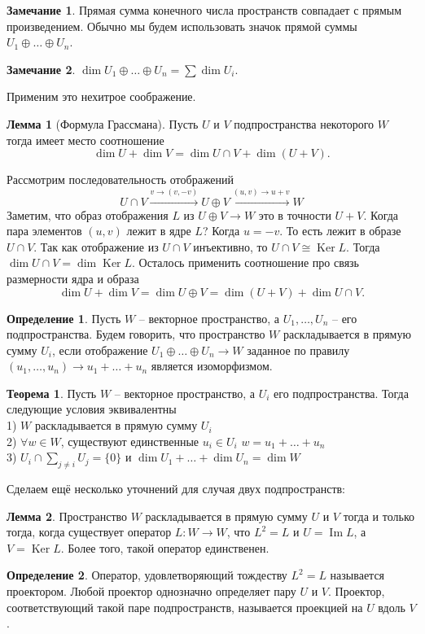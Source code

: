 \documentclass[10pt,a4paper,oneside]{book}
\theoremstyle{definition}
\newtheorem*{rem}{Замечание}
\newtheorem*{defn}{Определение}
\newtheorem{thm}{Теорема}
\newtheorem{lem}{Лемма}
\DeclareMathOperator{\Ker}{Ker}
\newcommand{\im}{\operatorname{Im}}
\def\thrm{\begin{thm}}
\def\ethrm{\end{thm}}
\def\dfn{\begin{defn}}
\def\edfn{\end{defn}}
\def\lm{\begin{lem}}
\def\elm{\end{lem}}
\def\rm{\begin{rem}}
\def\erm{\end{rem}}
\begin{document}
\rm Прямая сумма конечного числа пространств совпадает с прямым произведением. Обычно мы будем использовать значок прямой суммы $U_1\oplus \dots \oplus U_n$.
\erm


\rm $\dim U_1\oplus \dots \oplus U_n= \sum \dim U_i$.
\erm

Применим это нехитрое соображение.


\lm[Формула Грассмана] Пусть $U$ и $V$ подпространства некоторого $W$ тогда имеет место соотношение
$$\dim U +\dim V = \dim U\cap V + \dim (U+V).$$

\proof Рассмотрим последовательность отображений
$$U\cap V \stackrel{v\to (v,-v)}{\longrightarrow} U\oplus V \stackrel{(u,v)\to u+v}{\longrightarrow} W$$
Заметим, что образ отображения $L$ из $U\oplus V \to W$ это в точности $U+V$. Когда пара элементов $(u,v)$ лежит в ядре $L$? Когда $u=-v$. То есть лежит в образе $U \cap V$. Так как отображение из $U\cap V$ инъективно, то $U\cap V \cong \Ker L$. Тогда $\dim U\cap V = \dim \Ker L $. Осталось применить соотношение про связь размерности ядра и образа
$$\dim U+ \dim V = \dim U\oplus V= \dim(U+V)+\dim U\cap V.$$
\endproof
\elm

\dfn Пусть $W$ -- векторное пространство, а $U_1,\dots,U_n$ -- его подпространства. Будем говорить, что пространство $W$ раскладывается в прямую сумму $U_i$, если отображение $U_1\oplus \dots \oplus U_n \to W$ заданное по правилу $(u_1,\dots,u_n) \to u_1 +\dots+u_n$ является изоморфизмом.
\edfn

\thrm
Пусть $W$ -- векторное пространство, а $U_i$ его подпространства. Тогда следующие условия эквивалентны\\
1) $W$ раскладывается в прямую сумму $U_i$ \\
2) $\forall w \in W$, существуют единственные $u_i \in U_i$  $w=u_1+\dots+u_n$\\
3) $U_i\cap \sum_{j\neq i} U_j= \{0\}$ и $\dim U_1 +\dots+ \dim U_n =\dim W$\\
\ethrm

Сделаем ещё несколько уточнений для случая двух подпространств:

\lm Пространство $W$ раскладывается в прямую сумму $U$   и $V$ тогда и только тогда, когда существует оператор $L \colon W \to W$, что $L^2=L$ и $U=\im L$, а $V=\Ker L$. Более того, такой оператор единственен.
\elm

\dfn Оператор, удовлетворяющий тождеству $L^2=L$ называется проектором.
 Любой проектор однозначно определяет пару $U$ и $V$. Проектор, соответствующий такой паре подпространств, называется проекцией на $U$ вдоль $V$.
\edfn
\end{document}
